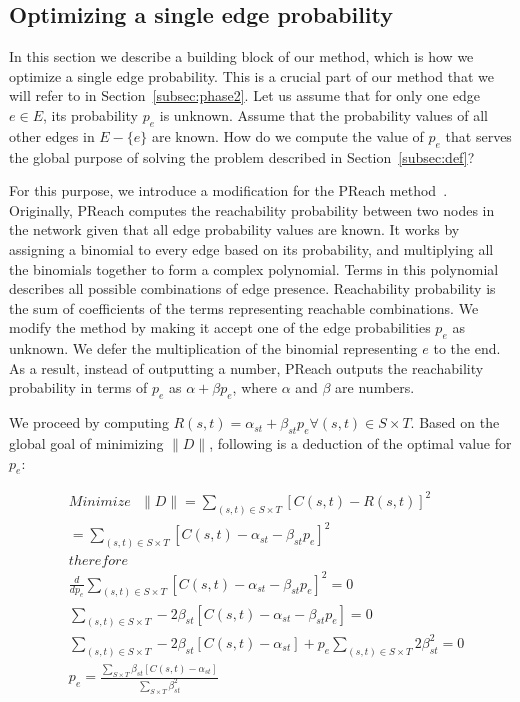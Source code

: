 \documentclass[runningheads,a4paper]{llncs}
\begin{document}
\subsection{Optimizing a single edge probability}
\label{subsec:single}

In this section we describe a building block of our method, which is how we
optimize a single edge probability. This is a crucial part of our method that we
will refer to in Section~\ref{subsec:phase2}. Let us assume that for only one
edge $e \in E$, its probability $p_e$ is unknown. Assume that the probability
values of all other edges in $E - \{e\}$ are known. How do we compute the value
of $p_e$ that serves the global purpose of solving the problem described in
Section~\ref{subsec:def}?

For this purpose, we introduce a modification for the PReach
method~\cite{preach}. Originally, PReach computes the reachability probability
between two nodes in the network given that all edge probability values are
known. It works by assigning a binomial to every edge based on its probability,
and multiplying all the binomials together to form a complex polynomial. Terms
in this polynomial describes all possible combinations of edge presence.
Reachability probability is the sum of coefficients of the terms representing
reachable combinations. We modify the method by making it accept one of the edge
probabilities $p_e$ as unknown. We defer the multiplication of the binomial
representing $e$ to the end. As a result, instead of outputting a number,
PReach outputs the reachability probability in terms of $p_e$ as $\alpha +
\beta p_e$, where $\alpha$ and $\beta$ are numbers.

We proceed by computing $R(s, t) = \alpha_{st} + \beta_{st} p_e \forall
(s, t) \in S \times T$. Based on the global goal of minimizing $\|D\|$,
following is a deduction of the optimal value for $p_e$:

\begin{align*}
&Minimize~~~\|D\| = \sum_{(s,t) \in S \times T} [C(s, t) - R(s, t)]^2\\
&			   = \sum_{(s,t) \in S \times T} [C(s, t) - \alpha_{st} -
			   \beta_{st} p_e]^2\\
&therefore\\
&\frac{d}{dp_e} \sum_{(s,t) \in S \times T} [C(s, t) - \alpha_{st} -
			   \beta_{st} p_e]^2 = 0\\
&\sum_{(s,t) \in S \times T} -2\beta_{st} [C(s, t) - \alpha_{st} -
\beta_{st} p_e] = 0\\
&\sum_{(s,t) \in S \times T} -2\beta_{st} [C(s, t) - \alpha_{st}] + p_e
\sum_{(s,t) \in S \times T} 2\beta_{st}^2 = 0\\
&p_e = \frac{\sum_{S \times T} \beta_{st} [C(s, t) -
\alpha_{st}]}{\sum_{S \times T} \beta_{st}^2}\\
\end{align*}
\end{document}
